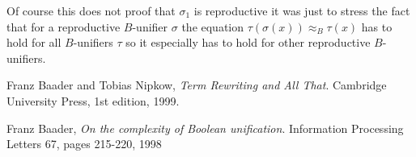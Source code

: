 		Of course this does not proof that $\sigma_1$ is reproductive it was just to stress the fact that for a reproductive $B$-unifier $\sigma$ the equation $\tau(\sigma(x))\approx_B\tau(x)$ has to hold for all $B$-unifiers $\tau$ so it especially has to hold for other reproductive $B$-unifiers.
		
		\begin{thebibliography}{9}
		
		  Franz Baader and Tobias Nipkow,
		  \emph{Term Rewriting and All That}.
		  Cambridge University Press,
		  1st edition,
		  1999.
		
			Franz Baader,
			\emph{On the complexity of Boolean unification}.
		 	Information Processing Letters 67,
		 	pages 215-220,
		 	1998
		
		\end{thebibliography}